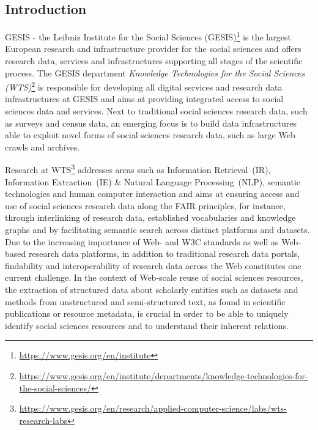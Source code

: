 \subsection {Introduction}


GESIS - the Leibniz Institute for the Social Sciences (GESIS)\footnote{\url{https://www.gesis.org/en/institute}} is the largest European research and infrastructure provider for the social sciences and offers research data, services and infrastructures supporting all stages of the scientific process. The GESIS department \textit{Knowledge Technologies for the Social Sciences (WTS)}\footnote{\url{ https://www.gesis.org/en/institute/departments/knowledge-technologies-for-the-social-sciences/}} is responsible for developing all digital services and research data infrastructures at GESIS and aims at providing integrated access to social sciences data and services. Next to traditional social sciences research data, such as surveys and census data, an emerging focus is to build data infrastructures able to exploit novel forms of social sciences research data, such as large Web crawls and archives. 

Research at WTS\footnote{\url{https://www.gesis.org/en/research/applied-computer-science/labs/wts-research-labs}} addresses areas such as Information Retrieval~(IR), Information Extraction~(IE) {\&} Natural Language Processing~(NLP), semantic technologies and human computer interaction and aims at ensuring access and use of social sciences research data along the FAIR principles, for instance, through interlinking of research data, established vocabularies and knowledge graphs and by facilitating semantic search across distinct platforms and datasets. Due to the increasing importance of Web- and W3C standards as well as Web-based research data platforms, in addition to traditional research data portals, findability and interoperability of research data across the Web constitutes one current challenge. In the context of Web-scale reuse of social sciences resources, the extraction of structured data about scholarly entities such as datasets and methods from unstructured and semi-structured text, as found in scientific publications or resource metadata, is crucial in order to be able to uniquely identify social sciences resources and to understand their inherent relations. 

